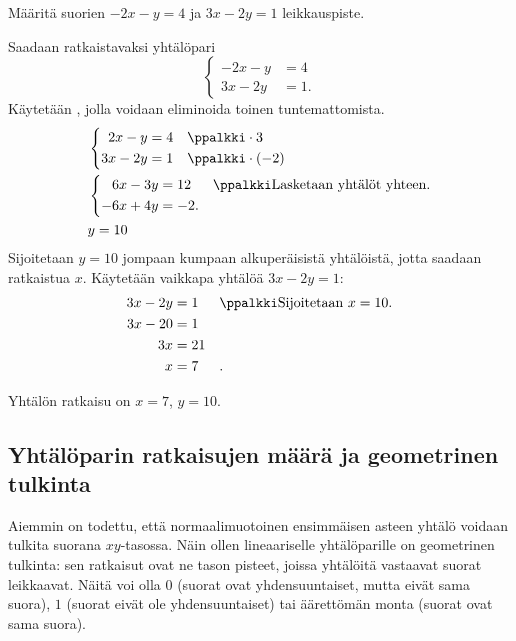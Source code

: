 \begin{esimerkki}
Määritä suorien $-2x-y= 4$ ja $3x-2y=1$ leikkauspiste.
\begin{esimratk}
Saadaan ratkaistavaksi yhtälöpari
\[
\left\{
\begin{aligned}
-2x-y&= 4 \\
3x-2y&= 1.
\end{aligned}
\right.
\]
Käytetään , jolla voidaan eliminoida toinen tuntemattomista.
\begin{align*}
  &\left\{
    \begin{aligned}
    2x-y&= 4 && \ppalkki \cdot 3\\
    3x-2y&= 1 && \ppalkki \cdot (-2)
    \end{aligned}
  \right. \\
  &\left\{
    \begin{aligned}
    6x-3y&= 12 && \ppalkki \text{Lasketaan yhtälöt yhteen.}\\
    -6x+4y&= -2.&&
    \end{aligned}
  \right.\\
  &y= 10 \\
\end{align*}
Sijoitetaan $y=10$ jompaan kumpaan alkuperäisistä yhtälöistä, jotta saadaan ratkaistua $x$. Käytetään vaikkapa yhtälöä $3x-2y=1$:
\begin{align*}
3x-2y&=1 && \ppalkki \text{Sijoitetaan $x=10$.} \\
3x-20&=1 && \\
3x&=21 && \\
x&=7 &&.
\end{align*}
\end{esimratk}
\begin{esimvast}
Yhtälön ratkaisu on $x=7$, $y=10$.
\end{esimvast}
\end{esimerkki}


\subsection{Yhtälöparin ratkaisujen määrä ja geometrinen tulkinta}

Aiemmin on todettu, että normaalimuotoinen ensimmäisen asteen yhtälö voidaan tulkita suorana
$xy$-tasossa. Näin ollen lineaariselle yhtälöparille on geometrinen tulkinta: sen
ratkaisut ovat ne tason pisteet, joissa yhtälöitä vastaavat
suorat leikkaavat. Näitä voi olla
$0$ (suorat ovat yhdensuuntaiset, mutta eivät sama suora),
$1$ (suorat eivät ole yhdensuuntaiset) tai
äärettömän monta (suorat ovat sama suora).

